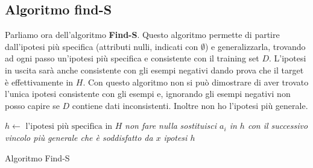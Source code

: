 \documentclass[a4paper,12pt, oneside]{book}
\begin{document}
\subsection{Algoritmo find-S}
Parliamo ora dell'algoritmo \textbf{Find-S}. Questo algoritmo permette di
partire dall'ipotesi più specifica (attributi nulli, indicati con
$\emptyset$) e generalizzarla, 
trovando ad ogni passo un'ipotesi più specifica e consistente con il training
set $D$. L'ipotesi in uscita sarà anche consistente con gli esempi negativi
dando prova che il target è effettivamente in $H$. Con questo algoritmo non si
può dimostrare di aver trovato l'unica ipotesi consistente con gli esempi e,
ignorando gli esempi negativi non posso capire se $D$ contiene dati
inconsistenti. Inoltre non ho l'ipotesi più generale.
\begin{algorithm}[H]
  \begin{algorithmic}
    \State $h\gets \mbox{ l'ipotesi più specifica in } H$
    \State \textit{non fare nulla}
    \Else
    \State \textit{sostituisci $a_i$ in $h$ con il successivo vincolo più}
    \State \textit{generale che è soddisfatto da $x$}
    \EndIf
    \EndFor
    \EndFor
    \Return \textit{ipotesi $h$}
    \EndFunction
  \end{algorithmic}
  \caption{Algoritmo Find-S}
\end{algorithm}
\end{document}
